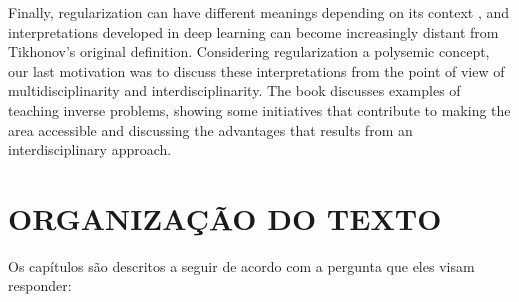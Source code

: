 Finally, regularization can have different meanings depending on its context \cite{Chen2002}, and interpretations developed in deep learning \cite{goodfellow2016deep} can become increasingly distant from Tikhonov's original definition. Considering regularization a polysemic concept, our last motivation was to discuss these interpretations from the point of view of multidisciplinarity and interdisciplinarity. The book discusses examples of teaching inverse problems, showing some initiatives that contribute to making the area accessible and discussing the advantages that results from an interdisciplinary approach.

\newpage
\section*{\centering ORGANIZAÇÃO DO TEXTO}
Os capítulos são descritos a seguir de acordo com a pergunta que eles
visam responder:
